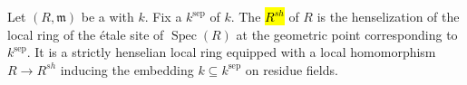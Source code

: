 \begin{definition} \label{definition:strict_henselization_of_a_local_ring}
Let $(R, \mathfrak{m})$ be a  with  $k$. Fix a  $k^{\text{sep}}$ of $k$. The  \hl{$R^{sh}$} of $R$ is the henselization of the local ring of the étale site of $\operatorname{Spec}(R)$ at the geometric point corresponding to $k^{\text{sep}}$. It is a strictly henselian local ring equipped with a local homomorphism $R \to R^{sh}$ inducing the embedding $k \subseteq k^{\text{sep}}$ on residue fields.
\end{definition}